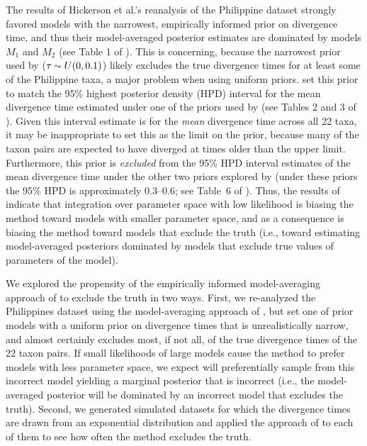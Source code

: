 The results of Hickerson et al.'s \citeyear{Hickerson2013} reanalysis of the
Philippine dataset strongly favored models with the narrowest, empirically
informed prior on divergence time, and thus their model-averaged posterior
estimates are dominated by models $M_1$ and $M_2$ (see Table 1 of
\citet{Hickerson2013}).
This is concerning, because the narrowest \divt{} prior used by
\citet{Hickerson2013} ($\tau_{} \sim U(0,0.1)$) likely excludes the true
divergence times for at least some of the Philippine taxa, a major problem when
using uniform priors.
\citet{Hickerson2013} set this prior to match the 95\% highest posterior
density (HPD) interval for the mean divergence time estimated under one of the
priors used by \citet{Oaks2012} (see Tables 2 and 3 of \citet{Oaks2012}).
Given this interval estimate is for the \emph{mean} divergence time across all
22 taxa, it may be inappropriate to set this as the limit on the prior, because
many of the taxon pairs are expected to have diverged at times older than the
upper limit.
Furthermore, this prior is \emph{excluded} from the 95\% HPD interval estimates
of the mean divergence time under the other two priors explored by
\citet{Oaks2012} (under these priors the 95\% HPD is approximately 0.3--0.6;
see Table~6 of \citet{Oaks2012}).
Thus, the results of \citet{Hickerson2013} indicate that integration over
parameter space with low likelihood is biasing the method toward models with
smaller parameter space, and as a consequence is biasing the method toward
models that exclude the truth (i.e., toward estimating model-averaged
posteriors dominated by models that exclude true values of parameters of the
model).


We explored the propensity of the empirically informed model-averaging approach
of \citet{Hickerson2013} to exclude the truth in two ways.
First, we re-analyzed the Philippines dataset using the model-averaging approach
of \citet{Hickerson2013}, but set one of prior models with a uniform prior on
divergence times that is unrealistically narrow, and almost certainly excludes
most, if not all, of the true divergence times of the 22 taxon pairs.
If small likelihoods of large models cause the method to prefer models with
less parameter space, we expect \msb will preferentially sample from this
incorrect model yielding a marginal posterior that is incorrect (i.e., the
model-averaged posterior will be dominated by an incorrect model that excludes
the truth).
Second, we generated simulated datasets for which the divergence times are
drawn from an exponential distribution and applied the approach of
\citet{Hickerson2013} to each of them to see how often the method excludes the
truth.

